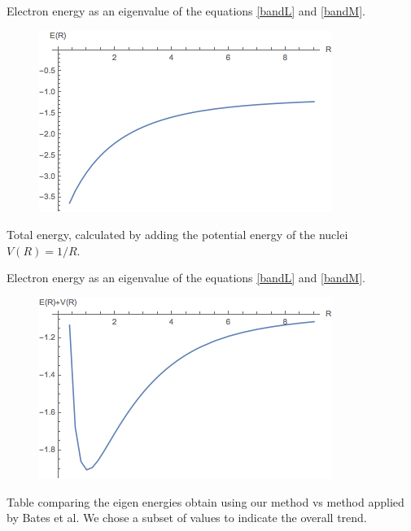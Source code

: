 Electron energy as an eigenvalue of the equations \eqref{bandL} and \eqref{bandM}.
\begin{figure}
  \includegraphics{Bates3DEofR.png}
\end{figure}

Total energy, calculated by adding the potential energy of the nuclei $ V(R) = 1/R $.

Electron energy as an eigenvalue of the equations \eqref{bandL} and \eqref{bandM}.
\begin{figure}
  \includegraphics{Bates3DEofRPlusVofR.png}
\end{figure}

Table comparing the eigen energies obtain using our method vs method applied by Bates et al. We chose a subset of values to indicate the overall trend.

